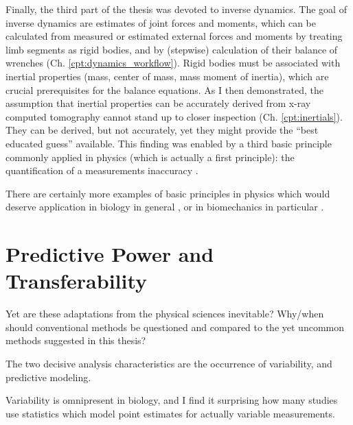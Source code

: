 \medskip
Finally, the third part of the thesis was devoted to inverse dynamics.
The goal of inverse dynamics are estimates of joint forces and moments, which can be calculated from measured or estimated external forces and moments by treating limb segments as rigid bodies, and by (stepwise) calculation of their balance of wrenches (Ch. \ref{cpt:dynamics_workflow}).
Rigid bodies must be associated with inertial properties (mass, center of mass, mass moment of inertia), which are crucial prerequisites for the balance equations.
As I then demonstrated, the assumption that inertial properties can be accurately derived from x-ray computed tomography cannot stand up to closer inspection (Ch. \ref{cpt:inertials}).
They can be derived, but not accurately, yet they might provide the ``best educated guess'' available.
This finding was enabled by a third basic principle commonly applied in physics (which is actually a first principle): the quantification of a measurements inaccuracy \citep{Hughes2010}.

\medskip
There are certainly more examples of basic principles in physics which would deserve application in biology in general \citep[e.g. Quantum Cognition,][]{Busemeyer2015,Aerts1995}, or in biomechanics in particular \citep[e.g. wrenches and quaternions,][]{Dumas2004}.


\section{Predictive Power and Transferability}
\label{sec:org152f108}
Yet are these adaptations from the physical sciences inevitable?
Why/when should conventional methods be questioned and compared to the yet uncommon methods suggested in this thesis?


The two decisive analysis characteristics are the occurrence of variability, and predictive modeling.

Variability is omnipresent in biology, and I find it surprising how many studies use statistics which model point estimates for actually variable measurements.

